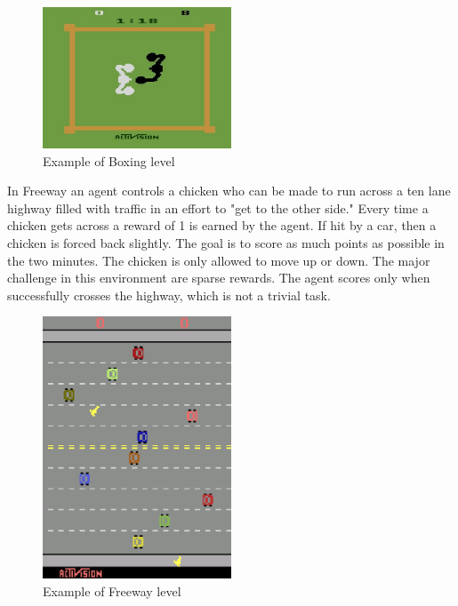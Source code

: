 \begin{figure}[H]
\includegraphics[width=0.5\textwidth,keepaspectratio]{figures/Boxing.jpg}
\caption[Boxing]{Example of Boxing level}
\label{Fig.Boxing}
\end{figure}

In Freeway an agent controls a chicken who can be made to run across a ten lane highway filled with traffic in an effort to "get to the other side." Every time a chicken gets across a reward of 1 is earned by the agent. If hit by a car, then a chicken is forced back slightly. The goal is to score as much points as possible in the two minutes. The chicken is only allowed to move up or down. 
The major challenge in this environment are sparse rewards. The agent scores only when successfully crosses the highway, which is not a trivial task.

\begin{figure}[H]
\includegraphics[width=0.5\textwidth,keepaspectratio]{figures/Freeway.png}
\caption[Freeway]{Example of Freeway level}
\label{Fig.Freeway}
\end{figure}


